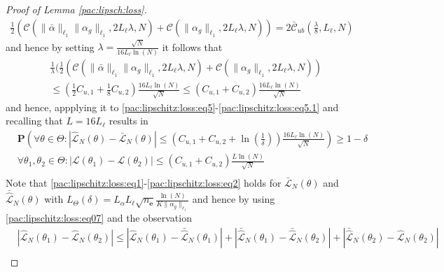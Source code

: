 \documentclass{article}
\newcommand{\e}{\mathbf{e}}
\newcommand{\bP}{\mathbf{P}}
\begin{document}
\begin{proof}[Proof of Lemma \ref{pac:lipsch:loss}]
   \begin{align*}
   \frac{1}{2} \left( \mathcal{C}(\|\bar{\alpha}\|_{\ell_1} \|\alpha_g\|_{\ell_1}, 2L_{\ell}\lambda,N)+
    \mathcal{C}(\|\alpha_g\|_{\ell_1}, 2L_{\ell}\lambda,N)\right) = 2\bar{\mathcal{C}}_{ub}(\frac{\lambda}{8}, L_{\ell},N)
   \end{align*}
   and hence by  setting $\lambda=\frac{\sqrt{N}}{16 L_{\ell}\ln(N)}$  it follows that
   \begin{align}
     & \frac{1}{\lambda} (\frac{1}{2} \left(\mathcal{C}(\|\bar{\alpha}\|_{\ell_1} \|\alpha_g\|_{\ell_1}, 2L_{\ell}\lambda,N)+
\mathcal{C}(\|\alpha_g\|_{\ell_1}, 2L_{\ell}\lambda,N)\right) \nonumber \\
     & \le (\frac{1}{2} C_{u,1}+\frac{1}{8} C_{u,2}) \frac{16 L_{\ell}\ln(N)}{\sqrt{N}}
     \le (C_{u,1}+C_{u,2}) \frac{16L_{\ell}\ln(N)}{\sqrt{N}}
    \label{pac:lipschitz:loss:eq6}
   \end{align}
    and hence, appplying it to \eqref{pac:lipschitz:loss:eq5}-\eqref{pac:lipschitz:loss:eq5.1} and recalling that
    $L=16L_{\ell}$ results in
    \begin{equation}
    \label{pac:lipschitz:loss:eq07}
      \begin{aligned}
      & \bP\left(\forall \theta \in \Theta: \left|\hat{\mathcal{L}}_N(\theta) - \bar{\mathcal{L}}_N(\theta)\right| \le (C_{u,1}+C_{u,2}+\ln(\frac{1}{\delta})) \frac{16 L_{\ell}\ln(N)}{\sqrt{N}}\right) \ge 1-\delta \\
      &  \forall \theta_1,\theta_2 \in \Theta: |\mathcal{L}(\theta_1) - \mathcal{L}(\theta_2)| \le  (C_{u,1}+C_{u,2}) \frac{L\ln(N)}{\sqrt{N}}\\
      \end{aligned}
    \end{equation}
     Note that  \eqref{pac:lipschitz:loss:eq1}-\eqref{pac:lipschitz:loss:eq2} holds for $\bar{\mathcal{L}}_N(\theta)$ and 
     $\bar{\hat{\mathcal{L}}}_N(\theta)$ with $L_{\Theta}(\delta)=L_{\alpha}L_{\ell}\sqrt{n_\e}\frac{\ln(N)}{K\|\alpha_g\|_{\ell_1}}$ and hence 
     by using \eqref{pac:lipschitz:loss:eq07} and the observation
     \begin{align*}
       & |\hat{\mathcal{L}}_N(\theta_1) - \hat{\mathcal{L}}_N(\theta_2)| \le
       |\hat{\mathcal{L}}_N(\theta_1) - \bar{\hat{\mathcal{L}}}_N(\theta_1)| + |\bar{\hat{\mathcal{L}}}_N(\theta_1) - \bar{\hat{\mathcal{L}}}_N(\theta_2)| + |\bar{\hat{\mathcal{L}}}_N(\theta_2) - \hat{\mathcal{L}}_N(\theta_2)| \\

\end{align*}
\end{proof}
\end{document}
